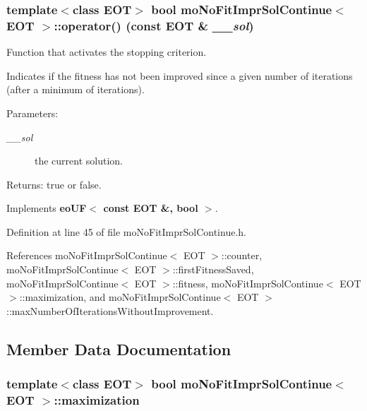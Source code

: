\subsubsection{\setlength{\rightskip}{0pt plus 5cm}template$<$class EOT$>$ bool {\bf moNoFitImprSolContinue}$<$ EOT $>$::operator() (const EOT \& {\em \_\-\_\-sol})\hspace{0.3cm}{\tt  [inline, virtual]}}\label{classmo_no_fit_impr_sol_continue_dbd663623cae56ec76ee504ecb226fed}


Function that activates the stopping criterion. 

Indicates if the fitness has not been improved since a given number of iterations (after a minimum of iterations). \begin{Desc}
\item[Parameters:]
\begin{description}
\item[{\em \_\-\_\-sol}]the current solution. \end{description}
\end{Desc}
\begin{Desc}
\item[Returns:]true or false. \end{Desc}


Implements {\bf eoUF$<$ const EOT \&, bool $>$}.

Definition at line 45 of file moNoFitImprSolContinue.h.

References moNoFitImprSolContinue$<$ EOT $>$::counter, moNoFitImprSolContinue$<$ EOT $>$::firstFitnessSaved, moNoFitImprSolContinue$<$ EOT $>$::fitness, moNoFitImprSolContinue$<$ EOT $>$::maximization, and moNoFitImprSolContinue$<$ EOT $>$::maxNumberOfIterationsWithoutImprovement.

\subsection{Member Data Documentation}
\subsubsection{\setlength{\rightskip}{0pt plus 5cm}template$<$class EOT$>$ bool {\bf moNoFitImprSolContinue}$<$ EOT $>$::{\bf maximization}\hspace{0.3cm}{\tt  [private]}}\label{classmo_no_fit_impr_sol_continue_73295d6a4ad437b0ab06848ac24698c4}


